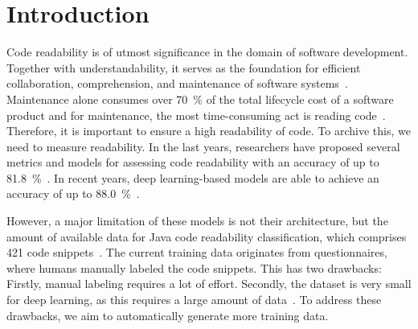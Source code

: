 \documentclass[%
class=scrreprt,
chapterprefix=false,%
open=right,%
twoside=false,%
paper=a4,%
logofile={Logo\_zentral\_farbig\_EN.png},%
thesistype=master,%
UKenglish,%
]{se2thesis}
\theoremstyle{definition}
\newcommand{\citeclassicmodels}{\cite{buse2009learning, posnett2011simpler, dorn2012general, scalabrino2018comprehensive}\xspace}
\newcommand{\citedeepmodels}{\cite{mi2018inception, mi2018improving, sharma2020egan, mi2022towards, mi2022rank, mi2023graph}\xspace}
\newcommand{\citeolddataset}{\cite{buse2009learning, dorn2012general, scalabrino2018comprehensive}\xspace}
\begin{document}
	\mainmatter
	
	\tableofcontents

\pagebreak
\section{Introduction} \label{Introduction}

	Code readability is of utmost significance in the domain of software development.
	Together with understandability, it serves as the foundation for efficient collaboration, comprehension, and maintenance of software systems~\cite{posnett2011simpler, aggarwal2002integrated}. 
	Maintenance alone consumes over 70~\% of the total lifecycle cost of a software product and for maintenance, the most time-consuming act is reading code~\cite{buse2009learning, deimel1985uses, rugaber2000use, boehm2001defect}.
	Therefore, it is important to ensure a high readability of code. To archive this, we need to measure readability.
	In the last years, researchers have proposed several metrics and models for assessing code readability with an accuracy of up to 81.8~\%~\citeclassicmodels. In recent years, deep learning-based models are able to achieve an accuracy of up to 88.0~\%~\citedeepmodels.
	
	However, a major limitation of these models is not their architecture, but the amount of available data for Java code readability classification, which comprises 421 code snippets~\citeolddataset. The current training data originates from questionnaires, where humans manually labeled the code snippets. This has two drawbacks: Firstly, manual labeling requires a lot of effort.
	Secondly, the dataset is very small for deep learning, as this requires a large amount of data~\cite{hestness2017deep}.
	To address these drawbacks, we aim to automatically generate more training data.
	
	
\end{document}
